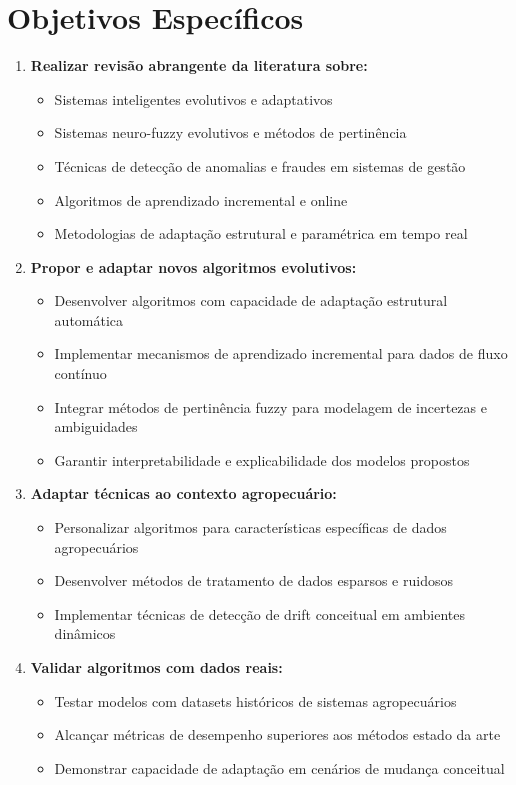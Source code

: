 \section{Objetivos Específicos}
\begin{enumerate}
  \item \textbf{Realizar revisão abrangente da literatura sobre:} 
  \begin{itemize}
    \item Sistemas inteligentes evolutivos e adaptativos
    \item Sistemas neuro-fuzzy evolutivos e métodos de pertinência
    \item Técnicas de detecção de anomalias e fraudes em sistemas de gestão
    \item Algoritmos de aprendizado incremental e online
    \item Metodologias de adaptação estrutural e paramétrica em tempo real
  \end{itemize}
  
  \item \textbf{Propor e adaptar novos algoritmos evolutivos:} 
  \begin{itemize}
    \item Desenvolver algoritmos com capacidade de adaptação estrutural automática
    \item Implementar mecanismos de aprendizado incremental para dados de fluxo contínuo
    \item Integrar métodos de pertinência fuzzy para modelagem de incertezas e ambiguidades
    \item Garantir interpretabilidade e explicabilidade dos modelos propostos
  \end{itemize}
  
  \item \textbf{Adaptar técnicas ao contexto agropecuário:} 
  \begin{itemize}
    \item Personalizar algoritmos para características específicas de dados agropecuários
    \item Desenvolver métodos de tratamento de dados esparsos e ruidosos
    \item Implementar técnicas de detecção de drift conceitual em ambientes dinâmicos
  \end{itemize}
  
  \item \textbf{Validar algoritmos com dados reais:} 
  \begin{itemize}
    \item Testar modelos com datasets históricos de sistemas agropecuários
    \item Alcançar métricas de desempenho superiores aos métodos estado da arte
    \item Demonstrar capacidade de adaptação em cenários de mudança conceitual
  \end{itemize}
  

\end{enumerate}
